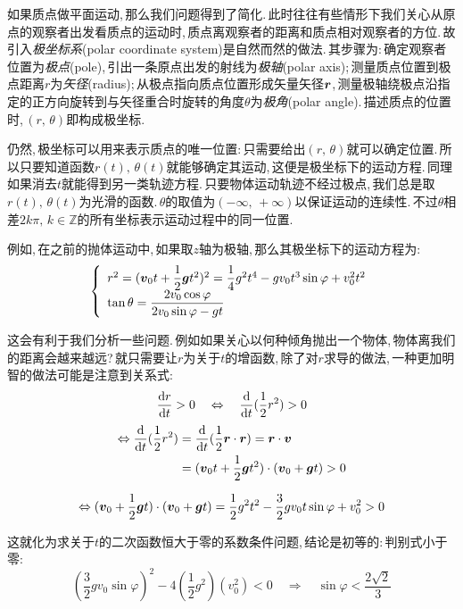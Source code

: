 如果质点做平面运动,\,那么我们问题得到了简化.\,此时往往有些情形下我们关心从原点的观察者出发看质点的运动时,\,质点离观察者的距离和质点相对观察者的方位.\,故引入\emph{极坐标系}(polar coordinate system)是自然而然的做法.\,其步骤为:\,确定观察者位置为\emph{极点}(pole),\,引出一条原点出发的射线为\emph{极轴}(polar axis);\,测量质点位置到极点距离$r$为\emph{矢径}(radius);\,从极点指向质点位置形成矢量矢径$\boldsymbol{r}$,\,测量极轴绕极点沿指定的正方向旋转到与矢径重合时旋转的角度$\theta$为\emph{极角}(polar angle).\,描述质点的位置时,\,$(r,\,\theta)$即构成极坐标.

仍然,\,极坐标可以用来表示质点的唯一位置:\,只需要给出$(r,\,\theta)$就可以确定位置.\,所以只要知道函数$r(t),\,\theta(t)$就能够确定其运动,\,这便是极坐标下的运动方程.\,同理如果消去$t$就能得到另一类轨迹方程.\,只要物体运动轨迹不经过极点,\,我们总是取$r(t),\,\theta(t)$为光滑的函数.\,$\theta$的取值为$(-\infty,\,+\infty)$以保证运动的连续性.\,不过$\theta$相差$2k\pi,\,k\in\mathbb{Z}$的所有坐标表示运动过程中的同一位置.

例如,\,在之前的抛体运动中,\,如果取$z$轴为极轴,\,那么其极坐标下的运动方程为:
\[\left\{\begin{array}{l} r^2=(\boldsymbol{v}_0 t+\dfrac{1}{2}\boldsymbol{g}t^2)^2=\dfrac{1}{4}g^2t^4  -gv_0t^3\sin\varphi + v_0^2t^2\\[3pt] \tan\theta=\dfrac{2v_0 \cos\varphi}{2v_0 \sin\varphi-gt}\end{array}\right.\]

这会有利于我们分析一些问题.\,例如如果关心以何种倾角抛出一个物体,\,物体离我们的距离会越来越远?\,就只需要让$r$为关于$t$的增函数,\,除了对$r$求导的做法,\,一种更加明智的做法可能是注意到关系式:
\[\frac{\textrm{d} r}{\textrm{d} t}>0  \quad\Leftrightarrow\quad	\frac{\textrm{d}}{\textrm{d} t}(\frac{1}{2}r^2)>0\]
\begin{align*} 
\Leftrightarrow \frac{\textrm{d}}{\textrm{d} t}(\frac{1}{2}r^2)	&=\frac{\textrm{d}}{\textrm{d} t}(\frac{1}{2}{\boldsymbol{r}\cdot\boldsymbol{r}})=\boldsymbol{r}\cdot\boldsymbol{v}\\
																			&=(\boldsymbol{v}_0 t+\dfrac{1}{2}\boldsymbol{g}t^2)\cdot(\boldsymbol{v}_0 +\boldsymbol{g}t)>0\\
\end{align*}

\[\Leftrightarrow (\boldsymbol{v}_0 +\dfrac{1}{2}\boldsymbol{g}t)\cdot(\boldsymbol{v}_0 +\boldsymbol{g}t)=\dfrac{1}{2}g^2t^2  -\dfrac{3}{2}gv_0t\sin\varphi + v_0^2>0\]

这就化为求关于$t$的二次函数恒大于零的系数条件问题,\,结论是初等的:\,判别式小于零:
\[\left(\dfrac{3}{2}gv_0\sin\varphi\right)^2-4\left(\dfrac{1}{2}g^2 \right)(v_0^2)<0\quad \Rightarrow\quad \sin\varphi<\frac{2\sqrt{2}}{3}\]

